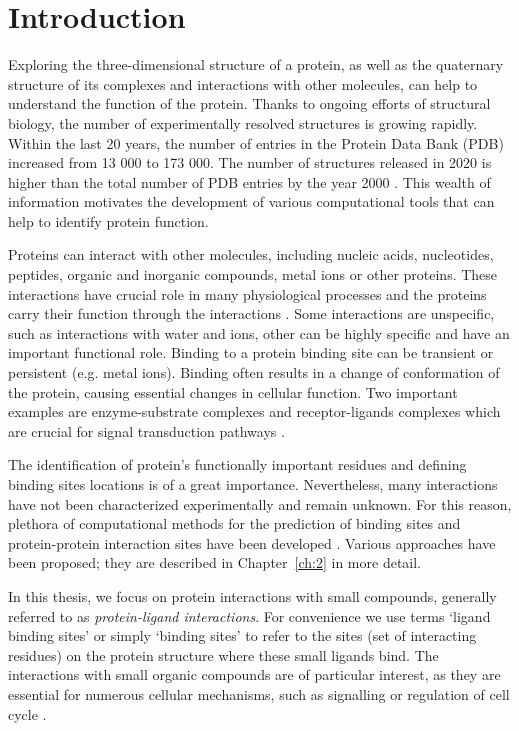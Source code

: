 
\chapter{Introduction}

Exploring the three-dimensional structure of a protein, as well as the quaternary structure of its complexes and interactions with other molecules, can help to understand the function of the protein. Thanks to ongoing efforts of structural biology, the number of experimentally resolved structures is growing rapidly. Within the last 20 years, the number of entries in the Protein Data Bank (PDB) \cite{pdb} increased from 13 000 to 173 000. The number of structures released in 2020 is higher than the total number of PDB entries by the year 2000 \cite{pdb_growth}. This wealth of information motivates the development of various computational tools that can help to identify protein function.

Proteins can interact with other molecules, including nucleic acids, nucleotides, peptides, organic and inorganic compounds, metal ions or other proteins. These interactions have crucial role in many physiological processes and the proteins carry their function through the interactions \cite{benchmark}. Some interactions are unspecific, such as interactions with water and ions, other can be highly specific and have an important functional role. Binding to a protein binding site can be transient or persistent (e.g. metal ions). Binding often results in a change of conformation of the protein, causing essential changes in cellular function. Two important examples are enzyme-substrate complexes and receptor-ligands complexes which are crucial for signal transduction pathways \cite{casp9}.

The identification of protein's functionally important residues and defining binding sites locations is of a great importance. Nevertheless, many interactions have not been characterized experimentally and remain unknown. For this reason, plethora of computational methods for the prediction of binding sites and protein-protein interaction sites have been developed \cite{casp9}. Various approaches have been proposed; they are described in Chapter~\ref{ch:2} in more detail.

In this thesis, we focus on protein interactions with small compounds, generally referred to as \textit{protein-ligand interactions}. For convenience we use terms `ligand binding sites' or simply `binding sites' to refer to the sites (set of interacting residues) on the protein structure where these small ligands bind. The interactions with small organic compounds are of particular interest, as they are essential for numerous cellular mechanisms, such as signalling or regulation of cell cycle \cite{benchmark}.

